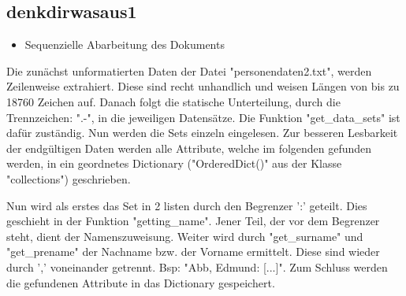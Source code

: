 \subsection{denkdirwasaus1}
 \label{subsec:denkdirwasaus1}

\begin{itemize}
 \item Sequenzielle Abarbeitung des Dokuments
\end{itemize}

Die zunächst unformatierten Daten der Datei "{}personendaten2.txt"{}, werden Zeilenweise extrahiert. Diese sind recht unhandlich und weisen Längen von bis zu 18760 Zeichen auf. Danach folgt die statische Unterteilung, durch die Trennzeichen: "{}.-"{}, in die jeweiligen Datensätze. Die Funktion "{}get\_data\_sets"{} ist dafür zuständig. Nun werden die Sets einzeln eingelesen. Zur besseren Lesbarkeit der endgültigen Daten werden alle Attribute, welche im folgenden gefunden werden, in ein geordnetes Dictionary ("{}OrderedDict()"{} aus der Klasse "{}collections"{}) geschrieben.

Nun wird als erstes das Set in 2 listen durch den Begrenzer '{}:'{} geteilt. Dies geschieht in der Funktion "{}getting\_name"{}. Jener Teil, der vor dem Begrenzer steht, dient der Namenszuweisung. Weiter wird durch "{}get\_surname"{} und "{}get\_prename"{} der Nachname bzw. der Vorname ermittelt. Diese sind wieder durch '{},'{} voneinander getrennt. Bsp: "{}Abb, Edmund: [...]"{}. Zum Schluss werden die gefundenen Attribute in das Dictionary gespeichert.

